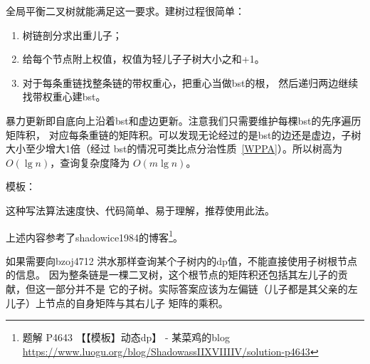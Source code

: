 全局平衡二叉树就能满足这一要求。建树过程很简单：
\begin{enumerate}
    \item 树链剖分求出重儿子；
    \item 给每个节点附上权值，权值为轻儿子子树大小之和+1。
    \item 对于每条重链找整条链的带权重心，把重心当做bst的根，
    然后递归两边继续找带权重心建bst。
\end{enumerate}

暴力更新即自底向上沿着bst和虚边更新。注意我们只需要维护每棵bst的先序遍历矩阵积，
对应每条重链的矩阵积。可以发现无论经过的是bst的边还是虚边，子树大小至少增大1倍（经过
bst的情况可类比点分治性质~\ref{WPPA}）。所以树高为$O(\lg n)$，查询复杂度降为
$O(m\lg n)$。

模板：


这种写法算法速度快、代码简单、易于理解，推荐使用此法。

上述内容参考了shadowice1984的博客\footnote{
    题解 P4643 【【模板】动态dp】 - 某菜鸡的blog\\
    \url{https://www.luogu.org/blog/ShadowassIIXVIIIIV/solution-p4643}
}。

如果需要向bzoj4712 洪水那样查询某个子树内的dp值，不能直接使用子树根节点的信息。
因为整条链是一棵二叉树，这个根节点的矩阵积还包括其左儿子的贡献，但这一部分并不是
它的子树。实际答案应该为左偏链（儿子都是其父亲的左儿子）上节点的自身矩阵与其右儿子
矩阵的乘积。
